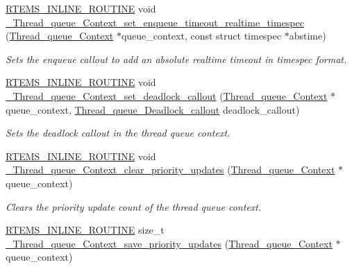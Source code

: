 \begin{DoxyCompactItemize}
\mbox{\hyperlink{group__RTEMSScoreBaseDefs_gac216239df231d5dbd15e3520b0b9313f}{R\+T\+E\+M\+S\+\_\+\+I\+N\+L\+I\+N\+E\+\_\+\+R\+O\+U\+T\+I\+NE}} void \mbox{\hyperlink{group__RTEMSScoreThreadQueue_gab148af32965cdef1887db52409f7ee86}{\+\_\+\+Thread\+\_\+queue\+\_\+\+Context\+\_\+set\+\_\+enqueue\+\_\+timeout\+\_\+realtime\+\_\+timespec}} (\mbox{\hyperlink{structThread__queue__Context}{Thread\+\_\+queue\+\_\+\+Context}} $\ast$queue\+\_\+context, const struct timespec $\ast$abstime)
\begin{DoxyCompactList}\small\item\em Sets the enqueue callout to add an absolute realtime timeout in timespec format. \end{DoxyCompactList}\item 
\mbox{\hyperlink{group__RTEMSScoreBaseDefs_gac216239df231d5dbd15e3520b0b9313f}{R\+T\+E\+M\+S\+\_\+\+I\+N\+L\+I\+N\+E\+\_\+\+R\+O\+U\+T\+I\+NE}} void \mbox{\hyperlink{group__RTEMSScoreThreadQueue_gab024e7369bc091e53e7bb04ed8ebfb61}{\+\_\+\+Thread\+\_\+queue\+\_\+\+Context\+\_\+set\+\_\+deadlock\+\_\+callout}} (\mbox{\hyperlink{structThread__queue__Context}{Thread\+\_\+queue\+\_\+\+Context}} $\ast$queue\+\_\+context, \mbox{\hyperlink{group__RTEMSScoreThreadQueue_gab2878c08655ad0911fe6540a1adaf3a3}{Thread\+\_\+queue\+\_\+\+Deadlock\+\_\+callout}} deadlock\+\_\+callout)
\begin{DoxyCompactList}\small\item\em Sets the deadlock callout in the thread queue context. \end{DoxyCompactList}\item 
\mbox{\hyperlink{group__RTEMSScoreBaseDefs_gac216239df231d5dbd15e3520b0b9313f}{R\+T\+E\+M\+S\+\_\+\+I\+N\+L\+I\+N\+E\+\_\+\+R\+O\+U\+T\+I\+NE}} void \mbox{\hyperlink{group__RTEMSScoreThreadQueue_gab84f558bc470437d43ce863f8024534e}{\+\_\+\+Thread\+\_\+queue\+\_\+\+Context\+\_\+clear\+\_\+priority\+\_\+updates}} (\mbox{\hyperlink{structThread__queue__Context}{Thread\+\_\+queue\+\_\+\+Context}} $\ast$queue\+\_\+context)
\begin{DoxyCompactList}\small\item\em Clears the priority update count of the thread queue context. \end{DoxyCompactList}\item 
\mbox{\hyperlink{group__RTEMSScoreBaseDefs_gac216239df231d5dbd15e3520b0b9313f}{R\+T\+E\+M\+S\+\_\+\+I\+N\+L\+I\+N\+E\+\_\+\+R\+O\+U\+T\+I\+NE}} size\+\_\+t \mbox{\hyperlink{group__RTEMSScoreThreadQueue_gae87ba650367cd3744e08ce9a0a23c8a0}{\+\_\+\+Thread\+\_\+queue\+\_\+\+Context\+\_\+save\+\_\+priority\+\_\+updates}} (\mbox{\hyperlink{structThread__queue__Context}{Thread\+\_\+queue\+\_\+\+Context}} $\ast$queue\+\_\+context)

\end{DoxyCompactItemize}

